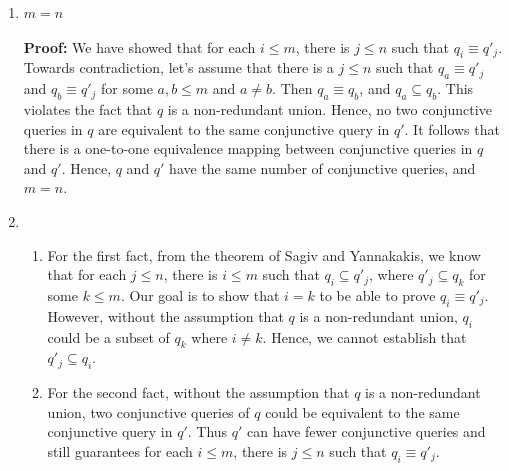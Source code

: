 \begin{enumerate}
\begin{enumerate}
    \item $m = n$ \\ \\ 
    \textbf{Proof:} We have showed that for each $i \leq m$, there is $j \leq n$ such that $q_i \equiv q'_j$. 
    Towards contradiction, let's assume that there is a $j \leq n$ such that $q_a \equiv q'_j$ and $q_b \equiv 
    q'_j$ for some $a, b \leq m$ and $a \neq b$. Then $q_a \equiv q_b$, and $q_a \subseteq q_b$. This violates 
    the fact that $q$ is a non-redundant union. Hence, no two conjunctive queries in $q$ are equivalent to the 
    same conjunctive query in $q'$. It follows that there is a one-to-one equivalence mapping between conjunctive 
    queries in $q$ and $q'$. Hence, $q$ and $q'$ have the same number of conjunctive queries, and $m = n$.

    \item 
    \begin{enumerate}
      \item For the first fact, from the theorem of Sagiv and Yannakakis, we know that for each $j \leq n$, there is 
    $i \leq m$ such that $q_i \subseteq q'_j$, where $q'_j \subseteq q_k$ for some $k \leq m$. Our goal is to 
    show that $i = k$ to be able to prove $q_i \equiv q'_j$. However, without the assumption that $q$ is a 
    non-redundant union, $q_i$ could be a subset of $q_k$ where $i \neq k$. Hence, we cannot establish that 
    $q'_j \subseteq q_i$. 
      \item For the second fact, without the assumption that $q$ is a non-redundant union, two conjunctive queries of 
    $q$ could be equivalent to the same conjunctive query in $q'$. Thus $q'$ can have fewer conjunctive queries 
    and still guarantees for each $i \leq m$, there is $j \leq n$ such that $q_i \equiv q'_j$. 
    \end{enumerate}
  \end{enumerate}
\end{enumerate}
